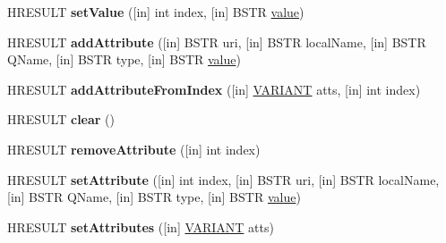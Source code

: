 \begin{DoxyCompactItemize}
\mbox{\label{interface_m_s_x_m_l2_1_1_i_m_x_attributes_a8d4f99767c5717b8113784cba73859b2}} 
H\+R\+E\+S\+U\+LT {\bfseries set\+Value} (\mbox{[}in\mbox{]} int index, \mbox{[}in\mbox{]} B\+S\+TR \hyperlink{unionvalue}{value})
\item 
\mbox{\label{interface_m_s_x_m_l2_1_1_i_m_x_attributes_a33924685cb6af8f67741e1d91ac93afa}} 
H\+R\+E\+S\+U\+LT {\bfseries add\+Attribute} (\mbox{[}in\mbox{]} B\+S\+TR uri, \mbox{[}in\mbox{]} B\+S\+TR local\+Name, \mbox{[}in\mbox{]} B\+S\+TR Q\+Name, \mbox{[}in\mbox{]} B\+S\+TR type, \mbox{[}in\mbox{]} B\+S\+TR \hyperlink{unionvalue}{value})
\item 
\mbox{\label{interface_m_s_x_m_l2_1_1_i_m_x_attributes_a7c4547f45667272260fbc1542b3d2043}} 
H\+R\+E\+S\+U\+LT {\bfseries add\+Attribute\+From\+Index} (\mbox{[}in\mbox{]} \hyperlink{structtag_v_a_r_i_a_n_t}{V\+A\+R\+I\+A\+NT} atts, \mbox{[}in\mbox{]} int index)
\item 
\mbox{\label{interface_m_s_x_m_l2_1_1_i_m_x_attributes_a95baeb45ff73dc3b3ac10605aaaa4b2a}} 
H\+R\+E\+S\+U\+LT {\bfseries clear} ()
\item 
\mbox{\label{interface_m_s_x_m_l2_1_1_i_m_x_attributes_a39d0193fbe46abfbe5c11244e5a8db18}} 
H\+R\+E\+S\+U\+LT {\bfseries remove\+Attribute} (\mbox{[}in\mbox{]} int index)
\item 
\mbox{\label{interface_m_s_x_m_l2_1_1_i_m_x_attributes_a1c638e41e142d66d013d0a0b0ccb3c07}} 
H\+R\+E\+S\+U\+LT {\bfseries set\+Attribute} (\mbox{[}in\mbox{]} int index, \mbox{[}in\mbox{]} B\+S\+TR uri, \mbox{[}in\mbox{]} B\+S\+TR local\+Name, \mbox{[}in\mbox{]} B\+S\+TR Q\+Name, \mbox{[}in\mbox{]} B\+S\+TR type, \mbox{[}in\mbox{]} B\+S\+TR \hyperlink{unionvalue}{value})
\item 
\mbox{\label{interface_m_s_x_m_l2_1_1_i_m_x_attributes_a8f09bc4910315612e54d2202df352ae9}} 
H\+R\+E\+S\+U\+LT {\bfseries set\+Attributes} (\mbox{[}in\mbox{]} \hyperlink{structtag_v_a_r_i_a_n_t}{V\+A\+R\+I\+A\+NT} atts)

\end{DoxyCompactItemize}
